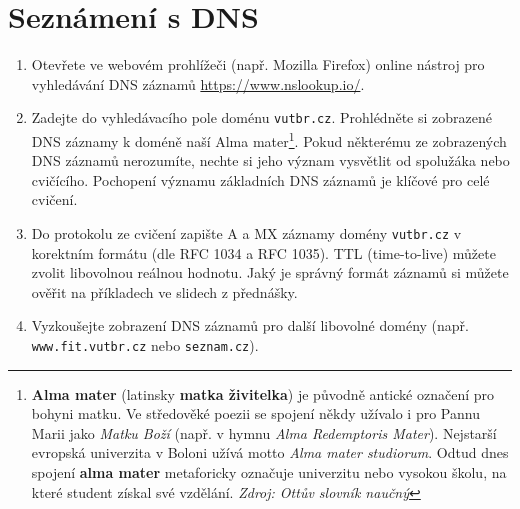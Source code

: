 \section{Seznámení s DNS}
\begin{enumerate}
    \item Otevřete ve webovém prohlížeči (např. Mozilla Firefox) online nástroj pro vyhledávání DNS záznamů \url{https://www.nslookup.io/}.
    \item Zadejte do vyhledávacího pole doménu \texttt{vutbr.cz}. Prohlédněte si zobrazené DNS záznamy k doméně naší Alma mater\footnote{\textbf{Alma mater} (latinsky \textbf{matka živitelka}) je původně antické označení pro bohyni matku. Ve středověké poezii se spojení někdy užívalo i pro Pannu Marii jako \emph{Matku Boží} (např. v hymnu \emph{Alma Redemptoris Mater}). Nejstarší evropská univerzita v Boloni užívá motto \emph{Alma mater studiorum}. Odtud dnes spojení \textbf{alma mater} metaforicky označuje univerzitu nebo vysokou školu, na které student získal své vzdělání. \emph{Zdroj: Ottův slovník naučný}}. Pokud některému ze zobrazených DNS záznamů nerozumíte, nechte si jeho význam vysvětlit od spolužáka nebo cvičícího. Pochopení významu základních DNS záznamů je klíčové pro celé cvičení.
    \item Do protokolu ze cvičení zapište A a MX záznamy domény \texttt{vutbr.cz} v korektním formátu (dle RFC 1034 a RFC 1035). TTL (time-to-live) můžete zvolit libovolnou reálnou hodnotu. Jaký je správný formát záznamů si můžete ověřit na příkladech ve slidech z přednášky.
    \item Vyzkoušejte zobrazení DNS záznamů pro další libovolné domény (např. \texttt{www.fit.vutbr.cz} nebo \texttt{seznam.cz}).
\end{enumerate}

